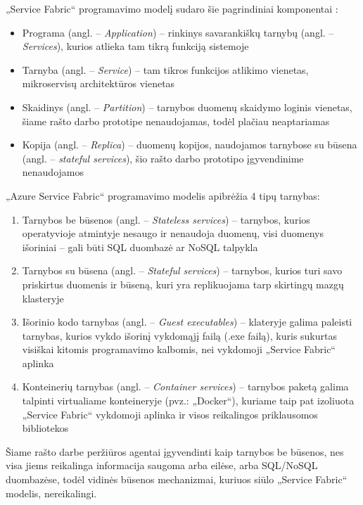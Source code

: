 „Service Fabric“ programavimo modelį sudaro šie pagrindiniai komponentai \cite{ServiceFabricTerminology}:

\begin{itemize}
    \item Programa (angl. -- \textit{Application}) -- rinkinys savarankiškų tarnybų (angl. -- \textit{Services}), kurios atlieka tam tikrą funkciją sistemoje
    \item Tarnyba (angl. -- \textit{Service}) -- tam tikros funkcijos atlikimo vienetas, mikroservisų architektūros vienetas
    \item Skaidinys (angl. -- \textit{Partition}) -- tarnybos duomenų skaidymo loginis vienetas, šiame rašto darbo prototipe nenaudojamas, todėl plačiau neaptariamas
    \item Kopija (angl. -- \textit{Replica}) -- duomenų kopijos, naudojamos tarnybose su būsena (angl. -- \textit{stateful services}), šio rašto darbo prototipo įgyvendinime nenaudojamos
\end{itemize}



„Azure Service Fabric“ programavimo modelis apibrėžia 4 tipų tarnybas:
\begin{enumerate}
    \item Tarnybos be būsenos (angl. -- \textit{Stateless services}) -- tarnybos, kurios operatyvioje atmintyje nesaugo ir nenaudoja duomenų, visi duomenys išoriniai -- gali būti SQL duombazė ar NoSQL talpykla \cite{ServiceFabricTerminology}
    \item Tarnybos su būsena (angl. -- \textit{Stateful services}) -- tarnybos, kurios turi savo priskirtus duomenis ir būseną, kuri yra replikuojama tarp skirtingų mazgų klasteryje \cite{ServiceFabricTerminology}
    \item Išorinio kodo tarnybas (angl. -- \textit{Guest executables}) -- klateryje galima paleisti tarnybas, kurios vykdo išorinį vykdomąjį failą (.exe failą), kuris sukurtas visiškai kitomis programavimo kalbomis, nei vykdomoji „Service Fabric“ aplinka \cite{ServiceFabricTerminology}
    \item Konteinerių tarnybas (angl. -- \textit{Container services}) -- tarnybos paketą galima talpinti virtualiame konteineryje (pvz.: „Docker“), kuriame taip pat izoliuota „Service Fabric“ vykdomoji aplinka ir visos reikalingos priklausomos bibliotekos \cite{ServiceFabricTerminology} 
\end{enumerate}

Šiame rašto darbe peržiūros agentai įgyvendinti kaip tarnybos be būsenos, nes visa jiems reikalinga informacija saugoma arba eilėse, arba SQL/NoSQL duombazėse, todėl vidinės būsenos mechanizmai, kuriuos siūlo „Service Fabric“ modelis, nereikalingi.

